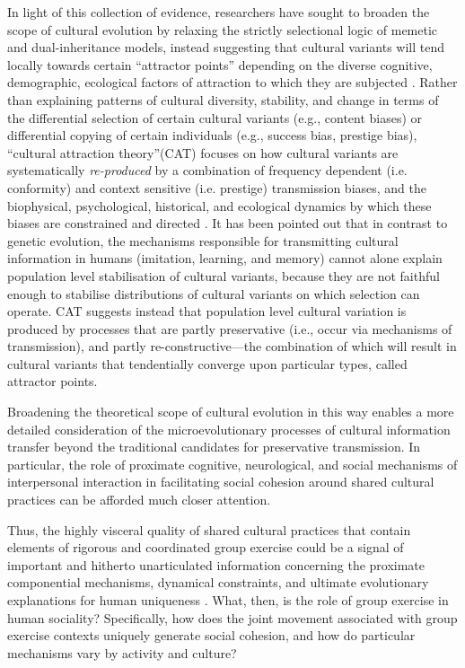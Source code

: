 In light of this collection of evidence, researchers have sought to broaden the scope of cultural evolution by relaxing the strictly selectional logic of memetic and dual-inheritance models, instead suggesting that cultural variants will tend locally towards certain ``attractor points'' depending on the diverse cognitive, demographic, ecological factors of attraction to which they are subjected \citep{Sperber1996}.  Rather than explaining patterns of cultural diversity, stability, and change in terms of the differential selection of certain cultural variants (e.g., content biases) or differential copying of certain individuals (e.g., success bias, prestige bias),  ``cultural attraction theory''(CAT) focuses on how cultural variants are systematically \textit{re-produced} by a combination of frequency dependent (i.e. conformity) and context sensitive (i.e. prestige) transmission biases, and the biophysical, psychological, historical, and ecological dynamics by which these biases are constrained and directed \citep{Claidiere2014}.  It has been pointed out that in contrast to genetic evolution, the mechanisms responsible for transmitting cultural information in humans (imitation, learning, and memory) cannot alone explain population level stabilisation of cultural variants, because they are not faithful enough to stabilise distributions of cultural variants on which selection can operate\cite{Claidiere2014}. CAT suggests instead that population level cultural variation is produced by processes that are partly preservative (i.e., occur via mechanisms of transmission), and partly re-constructive---the combination of which will result in cultural variants that tendentially converge upon particular types, called attractor points.

Broadening the theoretical scope of cultural evolution in this way enables a more detailed consideration of the microevolutionary processes of cultural information transfer beyond the traditional candidates for preservative transmission. In particular, the role of proximate cognitive, neurological, and social mechanisms of interpersonal interaction in facilitating social cohesion around shared cultural practices can be afforded much closer attention.




Thus, the highly visceral quality of shared cultural practices that contain elements of rigorous and coordinated group exercise could be a signal of important and hitherto unarticulated information concerning the proximate componential mechanisms, dynamical constraints, and ultimate evolutionary explanations for human uniqueness \citep[3]{Claidiere2014}.  What, then, is the role of group exercise in human sociality? Specifically, how does the joint movement associated with group exercise contexts uniquely generate social cohesion, and how do particular mechanisms vary by activity and culture?

